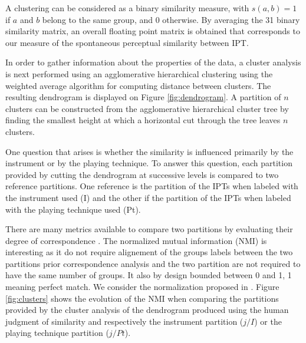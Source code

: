 \documentclass{article}
\newcommand{\ipt}{IPT\xspace}
\newcommand{\ipts}{IPTs\xspace}
\begin{document}
A clustering can be considered as a binary similarity measure, with $s(a, b) = 1$ if $a$ and $b$ belong to the same group, and $0$ otherwise. By averaging the 31 binary similarity matrix, an overall floating point matrix is obtained that corresponds to our measure of the spontaneous perceptual similarity between \ipt.

In order to gather information about the properties of the data, a cluster analysis is next performed using an agglomerative hierarchical clustering \cite{gordon1987review} using the weighted average algorithm for computing distance between clusters. The resulting dendrogram is displayed on Figure \ref{fig:dendrogram}. A partition of $n$ clusters can be constructed from the agglomerative hierarchical cluster tree by finding the smallest height at which a horizontal cut through the tree leaves $n$ clusters.

One question that arises is whether the similarity is influenced primarily by the instrument or by the playing technique. To answer this question, each partition provided by cutting the dendrogram at successive levels is compared to two reference partitions. One reference is the partition of the \ipts when labeled with the instrument used (I) and the other if the partition of the \ipts when labeled with the playing technique used (Pt).

There are many metrics available to compare two partitions by evaluating their degree of correspondence \cite{wagner2007comparing}. The normalized mutual information (NMI) is interesting as it do not require alignement of the groups labels between the two partitions prior correspondence analysis and the two partition are not required to have the same number of groups. It also by design bounded between 0 and 1, 1 meaning perfect match. We consider the normalization proposed in \cite{strehl2002cluster}. Figure \ref{fig:clusters} shows the evolution of the NMI when comparing the partitions provided by the cluster analysis of the dendrogram produced using the human judgment of similarity and respectively the instrument partition ($j/I$) or the playing technique partition ($j/Pt$).
\end{document}
